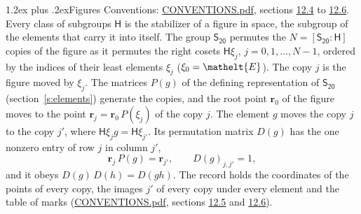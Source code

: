 \documentclass[10pt,a4paper]{article}
\makeatletter
\renewcommand\section{\@startsection{section}{1}{\z@}{-3ex plus -1ex minus -.2ex}%
  {1.2ex plus .2ex}{\normalfont\large\sffamily\bfseries\color{parttitle}}}
\numberwithin{equation}{section}
\newcommand{\eltfont}[1]{{\let\sigma\eltsigma\mathelt{#1}}}
\newcommand{\grp}[1]{\mathsf{#1}}
\newcommand{\cls}[1]{\eltfont{#1}}
\newcommand{\pointr}{\mathbf{r}}
\makeatother
\begin{document}
\section{Figures}\label{s:permutation}
Conventions: \href{../../CONVENTIONS.pdf}{CONVENTIONS.pdf}, sections \href{../../CONVENTIONS.pdf\#conv.12.4}{12.4} to \href{../../CONVENTIONS.pdf\#conv.12.6}{12.6}.
Every class of subgroups $\grp{H}$ is the stabilizer of a figure in space, the subgroup of the elements that carry it into itself. \label{n:local.orbit.size}\label{n:element.coset.least}\label{n:index.coset}The group $\grp{S_{20}}$ permutes the $N = [\grp{S_{20}} : \grp{H}]$ copies of the figure as it permutes the right cosets $\grp{H}\xi_j$, $j = 0, 1, \dots, N - 1$, ordered by the indices of their least elements $\xi_j$ ($\xi_0 = \cls{E}$). The copy $j$ is the figure moved by $\xi_j$. The matrices $P(g)$ of the defining representation of $\grp{S_{20}}$ (section~\ref{s:elements}) generate the copies, and the root point $\pointr_0$ of the figure moves to the point $\pointr_j = \pointr_0\, P(\xi_j)$ of the copy $j$. \label{n:local.coset.image}The element $g$ moves the copy $j$ to the copy $j'$, where $\grp{H}\xi_j g = \grp{H}\xi_{j'}$. \label{n:local.matrix.permutation}Its permutation matrix $D(g)$ has the one nonzero entry of row $j$ in column $j'$,
\begin{equation}\label{e:perm.matrix}\pointr_j\, P(g) = \pointr_{j'}, \qquad D(g)_{j,j'} = 1,\end{equation}
and it obeys $D(g)\, D(h) = D(gh)$. The record holds the coordinates of the points of every copy, the images $j'$ of every copy under every element and the table of marks (\href{../../CONVENTIONS.pdf}{CONVENTIONS.pdf}, sections \href{../../CONVENTIONS.pdf\#conv.12.5}{12.5} and \href{../../CONVENTIONS.pdf\#conv.12.6}{12.6}).
\end{document}

